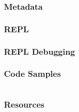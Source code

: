 \documentclass{beamer}
\begin{document}
\begin{frame}
  \frametitle{Metadata}

\end{frame}

\begin{frame}
  \frametitle{REPL}

\end{frame}

\begin{frame}
  \frametitle{REPL Debugging}

\end{frame}

\begin{frame}
  \frametitle{Code Samples} 
  \inputminted{clojure}{src/xml-parse.clj}
\end{frame}  

\begin{frame}
  \frametitle{Resources}
\end{frame}

% 
% 
\end{document}
